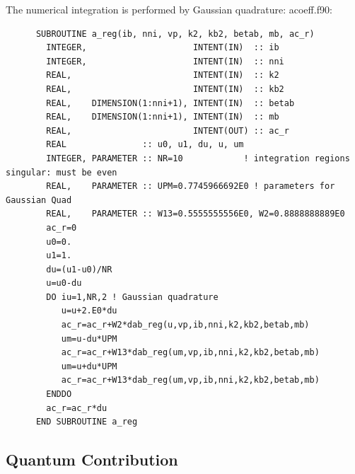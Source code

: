 \documentclass[preprint,12pt,eqsecnum,nofootinbib,amsmath,amssymb]{revtex4}
\begin{document}
\noindent
The numerical integration is performed by Gaussian quadrature:
\vskip0.4cm
\noindent
acoeff.f90:
{
\baselineskip 10pt
\begin{verbatim}
      SUBROUTINE a_reg(ib, nni, vp, k2, kb2, betab, mb, ac_r)
        INTEGER,                     INTENT(IN)  :: ib
        INTEGER,                     INTENT(IN)  :: nni 
        REAL,                        INTENT(IN)  :: k2
        REAL,                        INTENT(IN)  :: kb2
        REAL,    DIMENSION(1:nni+1), INTENT(IN)  :: betab
        REAL,    DIMENSION(1:nni+1), INTENT(IN)  :: mb
        REAL,                        INTENT(OUT) :: ac_r
        REAL               :: u0, u1, du, u, um
        INTEGER, PARAMETER :: NR=10            ! integration regions singular: must be even
        REAL,    PARAMETER :: UPM=0.7745966692E0 ! parameters for Gaussian Quad
        REAL,    PARAMETER :: W13=0.5555555556E0, W2=0.8888888889E0
        ac_r=0
        u0=0.
        u1=1.
        du=(u1-u0)/NR
        u=u0-du
        DO iu=1,NR,2 ! Gaussian quadrature
           u=u+2.E0*du
           ac_r=ac_r+W2*dab_reg(u,vp,ib,nni,k2,kb2,betab,mb)
           um=u-du*UPM
           ac_r=ac_r+W13*dab_reg(um,vp,ib,nni,k2,kb2,betab,mb)
           um=u+du*UPM
           ac_r=ac_r+W13*dab_reg(um,vp,ib,nni,k2,kb2,betab,mb)
        ENDDO
        ac_r=ac_r*du
      END SUBROUTINE a_reg
\end{verbatim}
}


\pagebreak
\subsection{Quantum Contribution}
\end{document}
